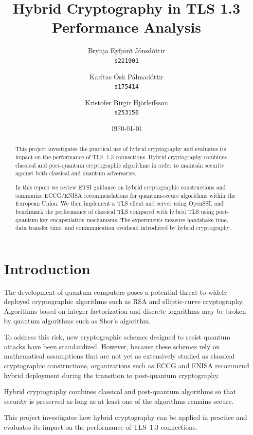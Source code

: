 \documentclass[11pt,a4paper]{article}
\title{Hybrid Cryptography in TLS 1.3 \\ Performance Analysis}
\author{
    Brynja Eyfjörð Jónsdóttir \\ 
    \texttt{s221901} \\
    \and
    Karítas Ósk Pálmadóttir \\
    \texttt{s175414}
    \and
    Kristofer Birgir Hjörleifsson \\
    \texttt{s253156}
}
\date{\today}
\begin{document}
\maketitle

\begin{abstract}
This project investigates the practical use of hybrid cryptography and evaluates its impact on the performance of TLS~1.3 connections. Hybrid cryptography combines classical and post-quantum cryptographic algorithms in order to maintain security against both classical and quantum adversaries. 

In this report we review ETSI guidance on hybrid cryptographic constructions and summarize ECCG/ENISA recommendations for quantum-secure algorithms within the European Union. We then implement a TLS client and server using OpenSSL and benchmark the performance of classical TLS compared with hybrid TLS using post-quantum key encapsulation mechanisms. The experiments measure handshake time, data transfer time, and communication overhead introduced by hybrid cryptography.
\end{abstract}

\section{Introduction}

The development of quantum computers poses a potential threat to widely deployed cryptographic algorithms such as RSA and elliptic-curve cryptography. Algorithms based on integer factorization and discrete logarithms may be broken by quantum algorithms such as Shor's algorithm.

To address this risk, new cryptographic schemes designed to resist quantum attacks have been standardized. However, because these schemes rely on mathematical assumptions that are not yet as extensively studied as classical cryptographic constructions, organizations such as ECCG and ENISA recommend hybrid deployment during the transition to post-quantum cryptography. 

Hybrid cryptography combines classical and post-quantum algorithms so that security is preserved as long as at least one of the algorithms remains secure.

This project investigates how hybrid cryptography can be applied in practice and evaluates its impact on the performance of TLS~1.3 connections.

\end{document}
